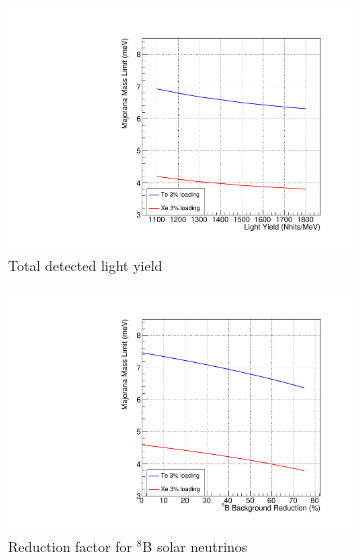 \begin{figure}
\centering
\begin{subfigure}[b]{0.49\textwidth}
 \includegraphics[width=\textwidth]{dbd/ly.pdf}
 \caption{Total detected light yield}
 \label{fig:scale-ly}
\end{subfigure}
\begin{subfigure}[b]{0.49\textwidth}
 \includegraphics[width=\textwidth]{dbd/b8_reduction.pdf}
 \caption{Reduction factor for $^8$B solar neutrinos}
 \label{fig:scale-b8}
\end{subfigure}\\
\begin{subfigure}[b]{0.49\textwidth}

\end{subfigure}
\end{figure}
